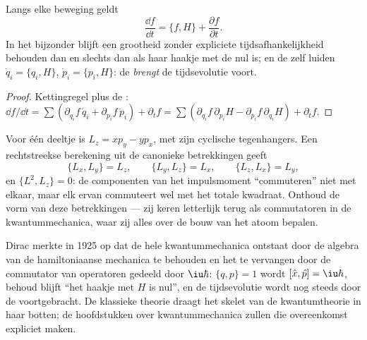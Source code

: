 \begin{theorem}\label{thm:b3:hamiltonian-mechanics:evolution}
Langs elke beweging geldt
\[
\frac{\dd f}{\dd t} = \{f, H\} + \frac{\partial f}{\partial t} .
\]
In het bijzonder blijft een grootheid zonder expliciete
tijdsafhankelijkheid behouden dan en slechts dan als haar haakje met de
 nul is; en de  zelf luiden $\dot q_i = \{q_i, H\}$, $\dot p_i
= \{p_i, H\}$: de  \emph{brengt} de
tijdsevolutie voort.
\end{theorem}

\begin{proof}
Kettingregel plus de : $\dd f/\dd t = \sum(
\partial_{q_i}f\,\dot q_i + \partial_{p_i}f\,\dot p_i) + \partial_tf =
\sum(\partial_{q_i}f\,\partial_{p_i}H - \partial_{p_i}f\,
\partial_{q_i}H) + \partial_tf$.
\end{proof}

\begin{example}\label{ex:b3:hamiltonian-mechanics:brackets}
Voor één deeltje is $L_z = xp_y - yp_x$, met zijn cyclische
tegenhangers. Een rechtstreekse berekening uit de canonieke betrekkingen
geeft
\[
\{L_x, L_y\} = L_z , \qquad
\{L_y, L_z\} = L_x , \qquad
\{L_z, L_x\} = L_y ,
\]
en $\{L^2, L_z\} = 0$: de componenten van het impulsmoment
``commuteren'' niet met elkaar, maar elk ervan commuteert wel met het
totale kwadraat. Onthoud de vorm van deze betrekkingen --- zij keren
letterlijk terug als commutatoren in de kwantummechanica, waar zij alles
over de bouw van het atoom bepalen.
\end{example}

\begin{remark}\label{rem:b3:hamiltonian-mechanics:doorway}
Dirac merkte in 1925 op dat de hele kwantummechanica ontstaat door de
algebra van de hamiltoniaanse mechanica te behouden en het 
te vervangen door de commutator van operatoren gedeeld door
$\iu\hbar$: $\{q, p\} = 1$ wordt $[\hat x, \hat p] = \iu\hbar$, behoud
blijft ``het haakje met $H$ is nul'', en de tijdsevolutie wordt nog
steeds door de  voortgebracht. De klassieke theorie draagt
het skelet van de kwantumtheorie in haar botten; de hoofdstukken over
kwantummechanica zullen die overeenkomst expliciet maken.
\end{remark}

